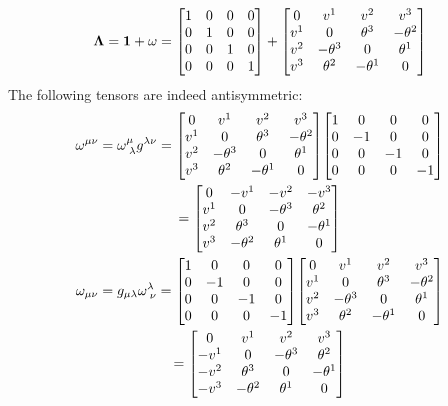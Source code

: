 \documentclass{report}
\begin{document}
\begin{subquests}
	\begin{gather*}
		\vb \Lambda = \vb 1 + \mathbf{\omega} = \mqty[
			1 & 0 & 0 & 0 \\
			0 & 1 & 0 & 0 \\
			0 & 0 & 1 & 0 \\
			0 & 0 & 0 & 1
		] +	\mqty[
			0 & v^1 & v^2 & v^3 \\
			v^1 & 0 & \theta^3 & -\theta^2 \\
			v^2 & -\theta^3 & 0 & \theta^1 \\
			v^3 & \theta^2 & -\theta^1 & 0
		]
	\end{gather*}
	The following tensors are indeed antisymmetric:
	\begin{gather*}
		\omega^{\mu\nu} = \omega^{\mu}_{\;\lambda}g^{\lambda\nu} =
		\mqty[
			0 & v^1 & v^2 & v^3 \\
			v^1 & 0 & \theta^3 & -\theta^2 \\
			v^2 & -\theta^3 & 0 & \theta^1 \\
			v^3 & \theta^2 & -\theta^1 & 0
		]
		\mqty[
			1 & 0 & 0 & 0 \\
			0 & -1 & 0 & 0 \\
			0 & 0 & -1 & 0 \\
			0 & 0 & 0 & -1 
		] \\
		= \mqty[
			0 & -v^1 & -v^2 & -v^3 \\
			v^1 & 0 & -\theta^3 & \theta^2 \\
			v^2 & \theta^3 & 0 & -\theta^1 \\
			v^3 & -\theta^2 & \theta^1 & 0
		] \\
		\omega_{\mu\nu} = g_{\mu\lambda}\omega^{\lambda}_{\;\nu} =
		\mqty[
			1 & 0 & 0 & 0 \\
			0 & -1 & 0 & 0 \\
			0 & 0 & -1 & 0 \\
			0 & 0 & 0 & -1 
		]\mqty[
			0 & v^1 & v^2 & v^3 \\
			v^1 & 0 & \theta^3 & -\theta^2 \\
			v^2 & -\theta^3 & 0 & \theta^1 \\
			v^3 & \theta^2 & -\theta^1 & 0
		] \\
		= \mqty[
			0 & v^1 & v^2 & v^3 \\
			-v^1 & 0 & -\theta^3 & \theta^2 \\
			-v^2 & \theta^3 & 0 & -\theta^1 \\
			-v^3 & -\theta^2 & \theta^1 & 0
		]
	\end{gather*}

	\item
\end{subquests}
\end{document}
